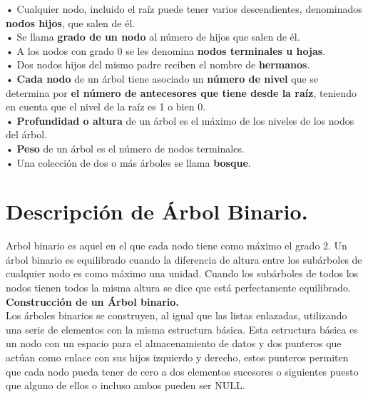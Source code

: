 \documentclass[12pt]{article}
\begin{document}
• Cualquier nodo, incluido el raíz puede tener varios descendientes, denominados \textbf{ nodos hijos}, que salen de él.\\

• Se llama \textbf{grado de un nodo} al número de hijos que salen de él.\\

• A los nodos con grado 0 se les denomina \textbf{nodos terminales u hojas}.\\

• Dos nodos hijos del mismo padre reciben el nombre de \textbf{hermanos}. \\ 

• \textbf{Cada nodo} de un árbol tiene asociado un \textbf{número de nivel} que se determina por \textbf{el número de antecesores que tiene desde la raíz}, teniendo en cuenta que el nivel de la raíz es 1 o bien 0.\\

• \textbf{Profundidad o altura} de un árbol es el máximo de los niveles de los nodos del árbol.\\

• \textbf{Peso} de un árbol es el número de nodos terminales.\\

• Una colección de dos o más árboles se llama \textbf{bosque}.\\

\pagebreak

\section{Descripción de Árbol Binario.}

Arbol binario es aquel en el que cada nodo tiene como máximo el grado 2. Un árbol binario es equilibrado cuando la diferencia de altura entre los subárboles de cualquier nodo es como máximo una unidad. Cuando los subárboles de todos los nodos tienen todos la misma altura se dice que está perfectamente equilibrado.\\

\textbf{Construcción de un Árbol binario.}\\

Los árboles binarios se construyen, al igual que las listas enlazadas, utilizando una serie de elementos con la misma estructura básica. Esta estructura básica es un nodo con un espacio para el almacenamiento de datos y dos punteros que actúan como enlace con sus hijos izquierdo y derecho, estos punteros permiten que cada nodo pueda tener de cero a dos elementos sucesores o siguientes puesto que alguno de ellos o incluso ambos pueden ser NULL.\\
\end{document}
